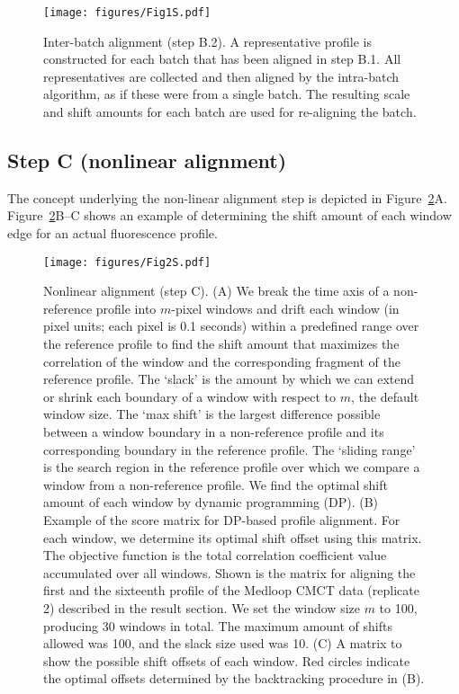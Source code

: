 \documentclass[letter]{bioinfo}
\begin{document}
\begin{figure}[!h]
\centering
    \texttt{[image: figures/Fig1S.pdf]}
\caption{Inter-batch alignment (step B.2). A representative profile is constructed for each batch that has been aligned in step B.1. All representatives are collected and then aligned by the intra-batch algorithm, as if these were from a single batch. The resulting scale and shift amounts for each batch are used for re-aligning the batch.
}
\label{f:fine-tuning}
\end{figure}

\subsection{Step C (nonlinear alignment)}
The concept underlying the non-linear alignment step is depicted in Figure~\ref{f:nonlinear}A. Figure~\ref{f:nonlinear}B--C shows an example of determining the shift amount of each window edge for an actual fluorescence profile.

\begin{figure}
\centering
    \texttt{[image: figures/Fig2S.pdf]}
\caption{Nonlinear alignment (step C). (A) We break the time axis of a non-reference profile into $m$-pixel windows and drift each window (in pixel units; each pixel is 0.1 seconds) within a predefined range over the reference profile to find the shift amount that maximizes the correlation of the window and the corresponding fragment of the reference profile. The `slack' is the amount by which we can extend or shrink each boundary of a window with respect to $m$, the default window size. The `max shift' is the largest difference possible between a window boundary in a non-reference profile and its corresponding boundary in the reference profile. The `sliding range' is the search region in the reference profile over which we compare a window from a non-reference profile. We find the optimal shift amount of each window by dynamic programming (DP). (B) Example of the score matrix for DP-based profile alignment. For each window, we determine its optimal shift offset using this matrix. The objective function is the total correlation coefficient value accumulated over all windows. Shown is the matrix for aligning the first and the sixteenth profile of the Medloop CMCT data (replicate 2) described in the result section. We set the window size $m$ to 100, producing 30 windows in total. The maximum amount of shifts allowed was 100, and the slack size used was 10. (C) A matrix to show the possible shift offsets of each window. Red circles indicate the optimal offsets determined by the backtracking procedure in (B).}
\label{f:nonlinear}
\end{figure}
\end{document}
